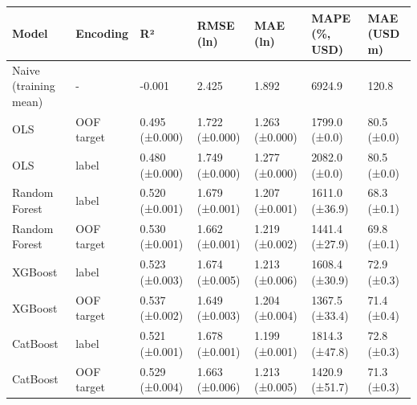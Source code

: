 \begin{tabular}{lllllll}
\toprule
Model & Encoding & R² & RMSE (ln) & MAE (ln) & MAPE (\%, USD) & MAE (USD m) \\
\midrule
Naive (training mean) & - & -0.001 & 2.425 & 1.892 & 6924.9 & 120.8 \\
OLS & OOF target & 0.495 (±0.000) & 1.722 (±0.000) & 1.263 (±0.000) & 1799.0 (±0.0) & 80.5 (±0.0) \\
OLS & label & 0.480 (±0.000) & 1.749 (±0.000) & 1.277 (±0.000) & 2082.0 (±0.0) & 80.5 (±0.0) \\
Random Forest & label & 0.520 (±0.001) & 1.679 (±0.001) & 1.207 (±0.001) & 1611.0 (±36.9) & 68.3 (±0.1) \\
Random Forest & OOF target & 0.530 (±0.001) & 1.662 (±0.001) & 1.219 (±0.002) & 1441.4 (±27.9) & 69.8 (±0.1) \\
XGBoost & label & 0.523 (±0.003) & 1.674 (±0.005) & 1.213 (±0.006) & 1608.4 (±30.9) & 72.9 (±0.3) \\
XGBoost & OOF target & 0.537 (±0.002) & 1.649 (±0.003) & 1.204 (±0.004) & 1367.5 (±33.4) & 71.4 (±0.4) \\
CatBoost & label & 0.521 (±0.001) & 1.678 (±0.001) & 1.199 (±0.001) & 1814.3 (±47.8) & 72.8 (±0.3) \\
CatBoost & OOF target & 0.529 (±0.004) & 1.663 (±0.006) & 1.213 (±0.005) & 1420.9 (±51.7) & 71.3 (±0.3) \\
\bottomrule
\end{tabular}

